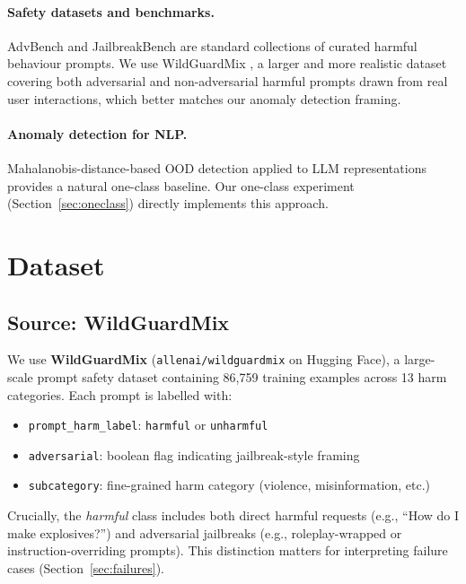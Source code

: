 \documentclass[11pt,a4paper]{article}
\begin{document}
\paragraph{Safety datasets and benchmarks.}
AdvBench \citep{advbench} and JailbreakBench \citep{jailbreakbench} are standard
collections of curated harmful behaviour prompts. We use WildGuardMix \citep{wildguard},
a larger and more realistic dataset covering both adversarial and non-adversarial harmful
prompts drawn from real user interactions, which better matches our anomaly detection framing.

\paragraph{Anomaly detection for NLP.}
Mahalanobis-distance-based OOD detection \citep{mahalanobis_ood} applied to LLM
representations provides a natural one-class baseline. Our one-class experiment
(Section~\ref{sec:oneclass}) directly implements this approach.

\section{Dataset}
\label{sec:dataset}

\subsection{Source: WildGuardMix}

We use \textbf{WildGuardMix} \citep{wildguard} (\texttt{allenai/wildguardmix} on
Hugging Face), a large-scale prompt safety dataset containing 86{,}759 training
examples across 13 harm categories. Each prompt is labelled with:

\begin{itemize}[noitemsep]
  \item \texttt{prompt\_harm\_label}: \texttt{harmful} or \texttt{unharmful}
  \item \texttt{adversarial}: boolean flag indicating jailbreak-style framing
  \item \texttt{subcategory}: fine-grained harm category (violence, misinformation, etc.)
\end{itemize}

Crucially, the \emph{harmful} class includes both direct harmful requests (e.g.,
``How do I make explosives?'') and adversarial jailbreaks (e.g., roleplay-wrapped
or instruction-overriding prompts). This distinction matters for interpreting
failure cases (Section~\ref{sec:failures}).
\end{document}
